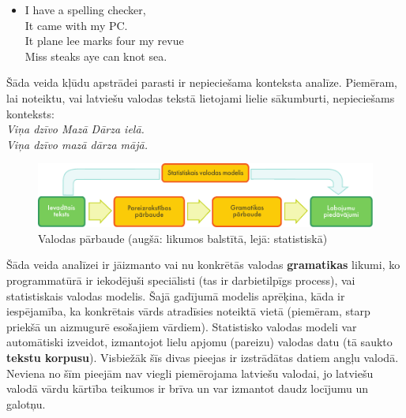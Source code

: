 \begin{multicols}{2}
\begin{itemize}
\item[] I have a spelling checker,\\
  It came with my PC.\\
  It plane lee marks four my revue\\
  Miss steaks aye can knot sea.\cite{Meta15}
\end{itemize}

Šāda veida kļūdu apstrādei parasti ir nepieciešama konteksta analīze.
Piemēram, lai noteiktu, vai latviešu valodas tekstā lietojami lielie sākumburti, nepieciešams konteksts:\\

\textit{Viņa dzīvo Mazā Dārza ielā.}\\
\textit{Viņa dzīvo mazā dārza mājā.}
\\

\begin{figure}[htb]
  \center
  \includegraphics[width=\textwidth]{../_media/latvian/language_checking}
  \caption{Valodas pārbaude (augšā: likumos balstītā, lejā: statistiskā)}
  \label{fig:langcheckingaarch_de}
\end{figure}

Šāda veida analīzei ir jāizmanto vai nu konkrētās valodas \textbf{gramatikas} likumi, ko programmatūrā ir iekodējuši speciālisti (tas ir darbietilpīgs process), vai statistiskais valodas modelis. 
Šajā gadījumā modelis aprēķina, kāda ir iespējamība, ka konkrētais vārds atradīsies noteiktā vietā (piemēram, starp priekšā un aizmugurē esošajiem vārdiem).
Statistisko valodas modeli var automātiski izveidot, izmantojot lielu apjomu (pareizu) valodas datu (tā saukto \textbf{tekstu korpusu}).
Visbiežāk šīs divas pieejas ir izstrādātas datiem angļu valodā.
Neviena no šīm pieejām nav viegli piemērojama latviešu valodai, jo latviešu valodā vārdu kārtība teikumos ir brīva un var izmantot daudz locījumu un galotņu. 



\end{multicols}
